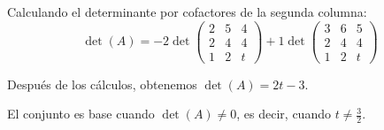 \begin{prob}
\begin{myproof}
Calculando el determinante por cofactores de la segunda columna:
$$\det(A) = -2\det\begin{pmatrix}2&5&4\\2&4&4\\1&2&t\end{pmatrix} + 1\det\begin{pmatrix}3&6&5\\2&4&4\\1&2&t\end{pmatrix}$$

Después de los cálculos, obtenemos $\det(A) = 2t - 3$.

El conjunto es base cuando $\det(A) \neq 0$, es decir, cuando $t \neq \frac{3}{2}$.
\end{myproof}
\end{prob}

